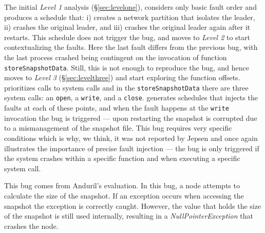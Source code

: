 The initial \emph{Level 1} analysis (\S\ref{sec:levelone}), considers only basic fault order and produces a schedule that:
i) creates a network partition that isolates the leader,
ii) crashes the original leader, and
iii) crashes the original leader again after it restarts.
This schedule does not trigger the bug, and \sys moves to \emph{Level 2} to start contextualizing the faults.
Here the last fault differs from the previous bug, with the last process crashed being contingent on the invocation of function \texttt{storeSnapshotData}.
Still, this is not enough to reproduce the bug, and hence \sys moves to \emph{Level 3} (\S\ref{sec:levelthree}) and start exploring the function offsets.
\sys prioritizes calls to system calls and in the \texttt{storeSnapshotData} there are three system calls: an \texttt{open}, a \texttt{write}, and a \texttt{close}.
\sys generates schedules that injects the faults at each of these points, and when the fault happens at the \texttt{write} invocation the bug is triggered --- upon restarting the snapshot is corrupted due to a mismanagement of the snapshot file.
This bug requires very specific conditions which is why, we think, it was not reported by Jepsen and once again illustrates the importance of precise fault injection --- the bug is only triggered if the system crashes within a specific function and when executing a specific system call.




 This bug comes from Anduril's evaluation.
In this bug, a node attempts to calculate the size of the snapshot.
If an exception occurs when accessing the snapshot the exception is correctly caught.
However, the value that holds the size of the snapshot is still used internally, resulting in a \emph{NullPointerException} that crashes the node.

